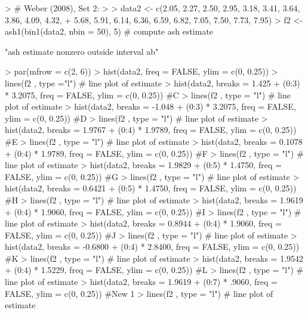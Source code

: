 \documentclass[12pt,letterpaper,final]{article}
\begin{document}
\begin{Schunk}
\begin{Sinput}
> # Weber (2008), Set 2:
> 
> data2 <- c(2.05, 2.27, 2.50, 2.95, 3.18, 3.41, 3.64, 3.86, 4.09, 4.32,
+   5.68, 5.91, 6.14, 6.36, 6.59, 6.82, 7.05, 7.50, 7.73, 7.95)
> f2 <- ash1(bin1(data2, nbin = 50), 5) # compute ash estimate
\end{Sinput}
\begin{Soutput}
[1] "ash estimate nonzero outside interval ab"
\end{Soutput}
\begin{Sinput}
> par(mfrow = c(2, 6))
> hist(data2, freq = FALSE, ylim = c(0, 0.25))
> lines(f2 , type ="l") # line plot of estimate
> hist(data2, breaks = 1.425 + (0:3) * 3.2075, freq = FALSE, ylim = c(0, 0.25)) #C
> lines(f2 , type = "l") # line plot of estimate
> hist(data2, breaks = -1.048 + (0:3) * 3.2075, freq = FALSE, ylim = c(0, 0.25)) #D
> lines(f2 , type = "l") # line plot of estimate
> hist(data2, breaks = 1.9767 + (0:4) * 1.9789, freq = FALSE, ylim = c(0, 0.25)) #E
> lines(f2 , type = "l") # line plot of estimate
> hist(data2, breaks = 0.1078 + (0:4) * 1.9789, freq = FALSE, ylim = c(0, 0.25)) #F
> lines(f2 , type = "l") # line plot of estimate
> hist(data2, breaks = 1.9829 + (0:5) * 1.4750, freq = FALSE, ylim = c(0, 0.25)) #G
> lines(f2 , type = "l") # line plot of estimate
> hist(data2, breaks = 0.6421 + (0:5) * 1.4750, freq = FALSE, ylim = c(0, 0.25)) #H
> lines(f2 , type = "l") # line plot of estimate
> hist(data2, breaks = 1.9619 + (0:4) * 1.9060, freq = FALSE, ylim = c(0, 0.25)) #I
> lines(f2 , type = "l") # line plot of estimate
> hist(data2, breaks = 0.8944 + (0:4) * 1.9060, freq = FALSE, ylim = c(0, 0.25)) #J
> lines(f2 , type = "l") # line plot of estimate
> hist(data2, breaks = -0.6800 + (0:4) * 2.8400, freq = FALSE, ylim = c(0, 0.25)) #K
> lines(f2 , type = "l") # line plot of estimate
> hist(data2, breaks = 1.9542 + (0:4) * 1.5229, freq = FALSE, ylim = c(0, 0.25)) #L
> lines(f2 , type = "l") # line plot of estimate
> hist(data2, breaks = 1.9619 + (0:7) * .9060, freq = FALSE, ylim = c(0, 0.25)) #New 1
> lines(f2 , type = "l") # line plot of estimate
\end{Sinput}
\end{Schunk}
\end{document}
